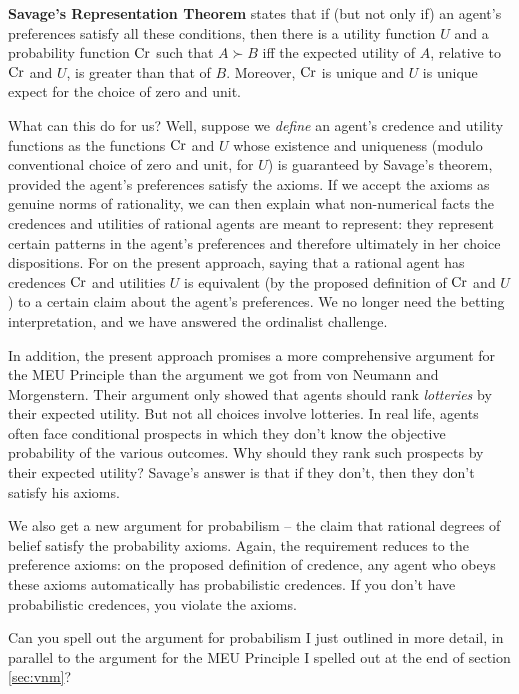 \textbf{Savage's Representation Theorem} states that if (but not only
if) an agent's preferences satisfy all these conditions, then there is
a utility function $U$ and a probability function $\text{Cr}$ such that $A
\succ B$ iff the expected utility of $A$, relative to $\text{Cr}$ and $U$,
is greater than that of $B$. Moreover, $\text{Cr}$ is unique and $U$ is
unique expect for the choice of zero and unit.

What can this do for us? Well, suppose we \emph{define} an agent's credence
and utility functions as the functions $\text{Cr}$ and $U$ whose existence
and uniqueness (modulo conventional choice of zero and unit, for $U$)
is guaranteed by Savage's theorem, provided the agent's preferences
satisfy the axioms. If we accept the axioms as genuine norms of
rationality, we can then explain what non-numerical facts the
credences and utilities of rational agents are meant to represent:
they represent certain patterns in the agent's preferences and
therefore ultimately in her choice dispositions. For on the present
approach, saying that a rational agent has credences $\text{Cr}$ and
utilities $U$ is equivalent (by the proposed definition of $\text{Cr}$ and
$U$) to a certain claim about the agent's preferences. We no longer
need the betting interpretation, and we have answered the ordinalist challenge.

In addition, the present approach promises a more comprehensive
argument for the MEU Principle than the argument we got from von
Neumann and Morgenstern. Their argument only showed that agents should
rank \emph{lotteries} by their expected utility. But not all choices
involve lotteries. In real life, agents often face conditional
prospects in which they don't know the objective probability of the
various outcomes. Why should they rank such prospects by their
expected utility? Savage's answer is that if they don't, then they
don't satisfy his axioms.

We also get a new argument for probabilism -- the claim that rational
degrees of belief satisfy the probability axioms. Again, the
requirement reduces to the preference axioms: on the proposed
definition of credence, any agent who obeys these axioms automatically
has probabilistic credences. If you don't have probabilistic
credences, you violate the axioms.

\begin{exercise2}
  Can you spell out the argument for probabilism I just outlined in
  more detail, in parallel to the argument for the MEU Principle I
  spelled out at the end of section \ref{sec:vnm}?
\end{exercise2}


